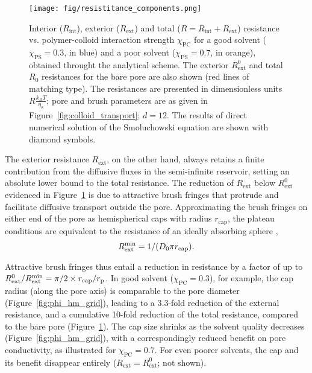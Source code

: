 \documentclass[12pt, a4paper]{article}
\begin{document}
\begin{figure}
    \centering
    \texttt{[image: fig/resistitance\_components.png]}
    \caption{
    Interior ($R_{\text{int}}$), exterior ($R_{\text{ext}}$) and total ($R = R_{\text{int}} + R_{\text{ext}}$) resistance vs. polymer-colloid interaction strength $\chi_{\text{PC}}$ for a good solvent ($\chi_{\text{PS}} = 0.3$, in blue) and a poor solvent ($\chi_{\text{PS}} = 0.7$, in orange), obtained throught the analytical scheme.
    The exterior $R_{\text{ext}}^{0}$ and total $R_0$ resistances for the bare pore are also shown (red lines of matching type).  
    The resistances are presented in dimensionless units $R\tfrac{k_{B}T}{\eta_{\text{S}}}$; pore and brush parameters are as given in Figure~\ref{fig:colloid_transport}; $d = 12$.
    The results of direct numerical solution of the Smoluchowski equation are shown with diamond symbols.
    }
    \label{fig:R_vs_chi_PC}
\end{figure}

The exterior resistance $R_{\text{ext}}$, on the other hand, always retains a finite contribution from the diffusive fluxes in the semi-infinite reservoir, setting an absolute lower bound to the total resistance.
The reduction of $R_{\text{ext}}$ below $R^0_\text{ext}$ evidenced in Figure~\ref{fig:R_vs_chi_PC} is due to attractive brush fringes that protrude and facilitate diffusive transport outside the pore.
Approximating the brush fringes on either end of the pore as hemispherical caps with radius $r_\text{cap}$, the plateau conditions are equivalent to the resistance of an ideally absorbing sphere \cite{Crank1980},
\begin{equation}
    R_\text{ext}^\text{\text{min}} = 1 / (D_0 \pi r_\text{cap}).
    \label{eq:R_ext_min}
\end{equation}

Attractive brush fringes thus entail a reduction in resistance by a factor of up to $R_\text{ext}^0 / R_\text{ext}^\text{\text{min}} = \pi/2 \times r_\text{cap}/r_\text{p}$.
In good solvent ($\chi_\text{PC} = 0.3$), for example, the cap radius (along the pore axis) is comparable to the pore diameter (Figure~\ref{fig:phi_hm_grid}), leading to a 3.3-fold reduction of the external resistance, and a cumulative 10-fold reduction of the total resistance, compared to the bare pore (Figure~\ref{fig:R_vs_chi_PC}).
The cap size shrinks as the solvent quality decreases (Figure~\ref{fig:phi_hm_grid}), with a correspondingly reduced benefit on pore conductivity, as illustrated for $\chi_\text{PC} = 0.7$.
For even poorer solvents, the cap and its benefit disappear entirely ($R_\text{ext} = R_\text{ext}^0$; not shown).
\end{document}
